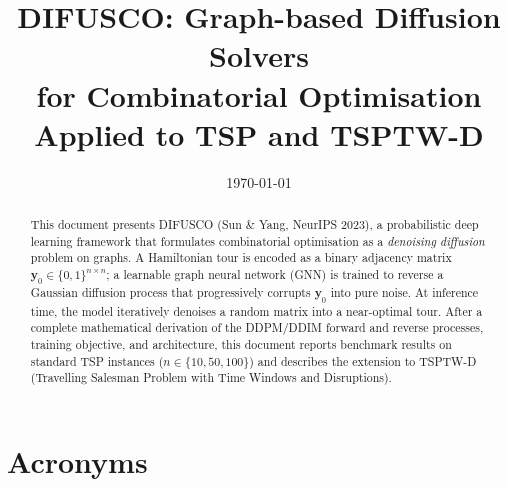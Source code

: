 \documentclass[12pt,a4paper]{article}
\title{%
  \LARGE\textbf{DIFUSCO: Graph-based Diffusion Solvers}\\[0.4em]
  \large for Combinatorial Optimisation\\[0.6em]
  \normalsize Applied to TSP and TSPTW-D
}
\date{\today}
\begin{document}

\maketitle
\thispagestyle{empty}

\begin{abstract}
This document presents DIFUSCO (Sun \& Yang, NeurIPS 2023), a probabilistic
deep learning framework that formulates combinatorial optimisation as a
\emph{denoising diffusion} problem on graphs.
A Hamiltonian tour is encoded as a binary adjacency matrix
$\mathbf{y}_0 \in \{0,1\}^{n \times n}$; a learnable graph neural network
(GNN) is trained to reverse a Gaussian diffusion process that progressively
corrupts $\mathbf{y}_0$ into pure noise.
At inference time, the model iteratively denoises a random matrix into a
near-optimal tour.
After a complete mathematical derivation of the DDPM/DDIM forward and reverse
processes, training objective, and architecture, this document reports benchmark
results on standard TSP instances ($n \in \{10, 50, 100\}$) and describes the
extension to TSPTW-D (Travelling Salesman Problem with Time Windows and
Disruptions).
\end{abstract}

\tableofcontents
\newpage


\section*{Acronyms}
\end{document}
